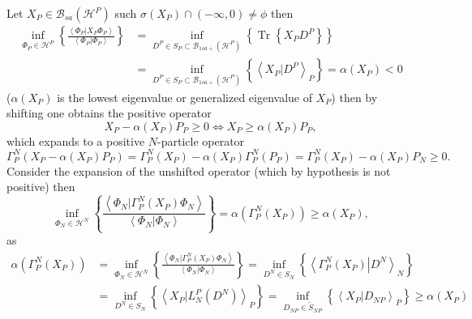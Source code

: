 \documentclass[aps,preprint]{revtex4}%
\begin{document}
Let $X_{P}\in\mathcal{B}_{sa}\left(  \mathcal{H}^{P}\right)  $ such
$\sigma\left(  X_{P}\right)  \cap\left(  -\infty,0\right)  \neq\phi$ then
\begin{align}
\inf_{\Phi_{P}\in\mathcal{H}^{P}}\left\{  \frac{\left\langle \left.  \Phi
_{P}\right\vert X_{P}\Phi_{P}\right\rangle }{\left\langle \left.  \Phi
_{P}\right\vert \Phi_{P}\right\rangle }\right\}   &  =\inf_{D^{P}\in
S_{P}\subset\mathcal{B}_{1sa+}\left(  \mathcal{H}^{P}\right)  }\left\{
\operatorname*{Tr}\left\{  X_{P}D^{P}\right\}  \right\} \nonumber\\
&  =\inf_{D^{P}\in S_{P}\subset\mathcal{B}_{1sa+}\left(  \mathcal{H}%
^{P}\right)  }\left\{  \left\langle \left.  X_{P}\right\vert D^{P}%
\right\rangle _{P}\right\}  =\alpha\left(  X_{P}\right)  <0
\end{align}
($\alpha\left(  X_{P}\right)  $ is the lowest eigenvalue or generalized
eigenvalue of $X_{P}$) then by shifting one obtains the positive operator
\begin{equation}
X_{P}-\alpha\left(  X_{P}\right)  P_{P}\geq0\Leftrightarrow X_{P}\geq
\alpha\left(  X_{P}\right)  P_{P},
\end{equation}
which expands to a positive $N$-particle operator%
\begin{equation}
\Gamma_{P}^{N}\left(  X_{P}-\alpha\left(  X_{P}\right)  P_{P}\right)
=\Gamma_{P}^{N}\left(  X_{P}\right)  -\alpha\left(  X_{P}\right)  \Gamma
_{P}^{N}\left(  P_{P}\right)  =\Gamma_{P}^{N}\left(  X_{P}\right)
-\alpha\left(  X_{P}\right)  P_{N}\geq0.
\end{equation}
Consider the expansion of the unshifted operator (which by hypothesis is not
positive) then
\begin{equation}
\inf_{\Phi_{N}\in\mathcal{H}^{N}}\left\{  \frac{\left\langle \left.  \Phi
_{N}\right\vert \Gamma_{P}^{N}\left(  X_{P}\right)  \Phi_{N}\right\rangle
}{\left\langle \left.  \Phi_{N}\right\vert \Phi_{N}\right\rangle }\right\}
=\alpha\left(  \Gamma_{P}^{N}\left(  X_{P}\right)  \right)  \geq\alpha\left(
X_{P}\right)  ,
\end{equation}
as%
\begin{align}
\alpha\left(  \Gamma_{P}^{N}\left(  X_{P}\right)  \right)   &  =\inf_{\Phi
_{N}\in\mathcal{H}^{N}}\left\{  \frac{\left\langle \left.  \Phi_{N}\right\vert
\Gamma_{P}^{N}\left(  X_{P}\right)  \Phi_{N}\right\rangle }{\left\langle
\left.  \Phi_{N}\right\vert \Phi_{N}\right\rangle }\right\}  =\inf_{D^{N}\in
S_{N}}\left\{  \left\langle \left.  \Gamma_{P}^{N}\left(  X_{P}\right)
\right\vert D^{N}\right\rangle _{N}\right\} \nonumber\\
&  =\inf_{D^{N}\in S_{N}}\left\{  \left\langle \left.  X_{P}\right\vert
L_{N}^{P}\left(  D^{N}\right)  \right\rangle _{P}\right\}  =\inf_{D_{NP}%
\in\tilde{S}_{NP}}\left\{  \left\langle \left.  X_{P}\right\vert
D_{NP}\right\rangle _{P}\right\}  \geq\alpha\left(  X_{P}\right)
\end{align}
\end{document}
